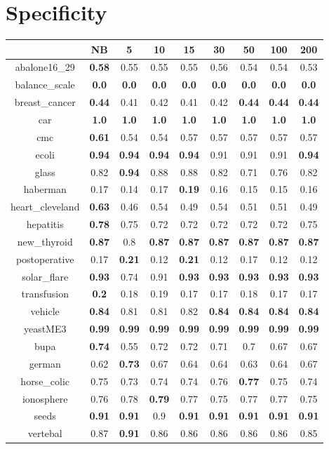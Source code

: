 \documentclass{article}%
\begin{document}
%
\section*{Specificity}%
\begin{tabular}{c|cccccccc}%
\hline%
&NB&5&10&15&30&50&100&200\\%
\hline%
abalone16\_29&\textbf{0.58}&0.55&0.55&0.55&0.56&0.54&0.54&0.53\\%
\hline%
balance\_scale&\textbf{0.0}&\textbf{0.0}&\textbf{0.0}&\textbf{0.0}&\textbf{0.0}&\textbf{0.0}&\textbf{0.0}&\textbf{0.0}\\%
\hline%
breast\_cancer&\textbf{0.44}&0.41&0.42&0.41&0.42&\textbf{0.44}&\textbf{0.44}&\textbf{0.44}\\%
\hline%
car&\textbf{1.0}&\textbf{1.0}&\textbf{1.0}&\textbf{1.0}&\textbf{1.0}&\textbf{1.0}&\textbf{1.0}&\textbf{1.0}\\%
\hline%
cmc&\textbf{0.61}&0.54&0.54&0.57&0.57&0.57&0.57&0.57\\%
\hline%
ecoli&\textbf{0.94}&\textbf{0.94}&\textbf{0.94}&\textbf{0.94}&0.91&0.91&0.91&\textbf{0.94}\\%
\hline%
glass&0.82&\textbf{0.94}&0.88&0.88&0.82&0.71&0.76&0.82\\%
\hline%
haberman&0.17&0.14&0.17&\textbf{0.19}&0.16&0.15&0.15&0.16\\%
\hline%
heart\_cleveland&\textbf{0.63}&0.46&0.54&0.49&0.54&0.51&0.51&0.49\\%
\hline%
hepatitis&\textbf{0.78}&0.75&0.72&0.72&0.72&0.72&0.72&0.75\\%
\hline%
new\_thyroid&\textbf{0.87}&0.8&\textbf{0.87}&\textbf{0.87}&\textbf{0.87}&\textbf{0.87}&\textbf{0.87}&\textbf{0.87}\\%
\hline%
postoperative&0.17&\textbf{0.21}&0.12&\textbf{0.21}&0.12&0.17&0.12&0.12\\%
\hline%
solar\_flare&\textbf{0.93}&0.74&0.91&\textbf{0.93}&\textbf{0.93}&\textbf{0.93}&\textbf{0.93}&\textbf{0.93}\\%
\hline%
transfusion&\textbf{0.2}&0.18&0.19&0.17&0.17&0.18&0.17&0.17\\%
\hline%
vehicle&\textbf{0.84}&0.81&0.81&0.82&\textbf{0.84}&\textbf{0.84}&\textbf{0.84}&\textbf{0.84}\\%
\hline%
yeastME3&\textbf{0.99}&\textbf{0.99}&\textbf{0.99}&\textbf{0.99}&\textbf{0.99}&\textbf{0.99}&\textbf{0.99}&\textbf{0.99}\\%
\hline%
bupa&\textbf{0.74}&0.55&0.72&0.72&0.71&0.7&0.67&0.67\\%
\hline%
german&0.62&\textbf{0.73}&0.67&0.64&0.64&0.63&0.64&0.67\\%
\hline%
horse\_colic&0.75&0.73&0.74&0.74&0.76&\textbf{0.77}&0.75&0.74\\%
\hline%
ionosphere&0.76&0.78&\textbf{0.79}&0.77&0.75&0.77&0.77&0.75\\%
\hline%
seeds&\textbf{0.91}&\textbf{0.91}&0.9&\textbf{0.91}&\textbf{0.91}&\textbf{0.91}&\textbf{0.91}&\textbf{0.91}\\%
\hline%
vertebal&0.87&\textbf{0.91}&0.86&0.86&0.86&0.86&0.86&0.85\\%
\hline%
\end{tabular}
\end{document}
